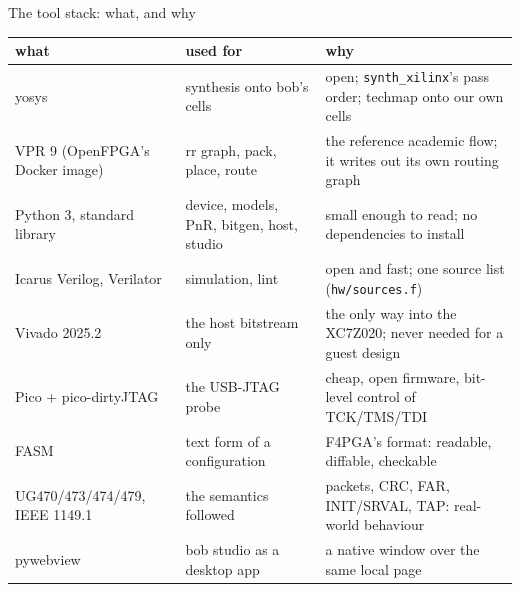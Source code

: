 \documentclass[aspectratio=169,11pt]{beamer}
\begin{document}
\begin{frame}{The tool stack: what, and why}
  \centering
  \scriptsize
  \renewcommand{\arraystretch}{1.2}
  \begin{tabular}{@{}L{30mm}L{40mm}L{60mm}@{}}
    \toprule
    \textbf{what} & \textbf{used for} & \textbf{why} \\
    \midrule
    yosys & synthesis onto bob's cells & open; \texttt{synth\_xilinx}'s pass order; techmap onto our own cells \\
    VPR 9 (OpenFPGA's Docker image) & rr graph, pack, place, route & the reference academic flow; it writes out its own routing graph \\
    Python 3, standard library & device, models, PnR, bitgen, host, studio & small enough to read; no dependencies to install \\
    Icarus Verilog, Verilator & simulation, lint & open and fast; one source list (\texttt{hw/sources.f}) \\
    Vivado 2025.2 & the host bitstream only & the only way into the XC7Z020; never needed for a guest design \\
    Pico + pico-dirtyJTAG & the USB-JTAG probe & cheap, open firmware, bit-level control of TCK/TMS/TDI \\
    FASM & text form of a configuration & F4PGA's format: readable, diffable, checkable \\
    UG470/473/474/479, IEEE 1149.1 & the semantics followed & packets, CRC, FAR, INIT/SRVAL, TAP: real-world behaviour \\
    pywebview & bob studio as a desktop app & a native window over the same local page \\
    \bottomrule
  \end{tabular}
\end{frame}
\end{document}
